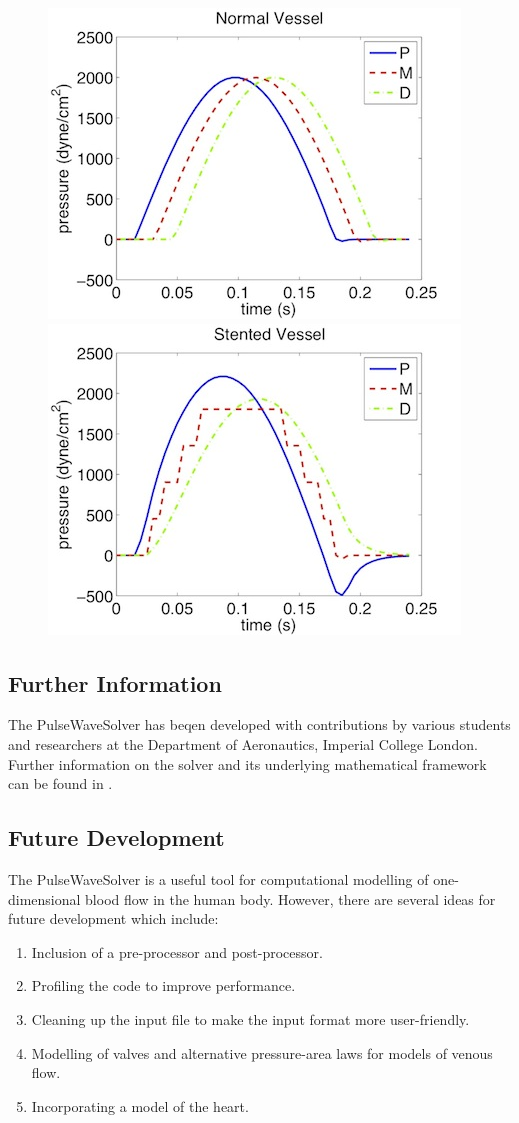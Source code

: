 \begin{figure}
	\includegraphics[width=0.49\linewidth]{img/pressure_normal_vessel.jpg}
	\includegraphics[width=0.49\linewidth]{img/pressure_stented_vessel.jpg}
\end{figure}

\subsection{Further Information}
The PulseWaveSolver has beqen developed with contributions by various students
and researchers at the Department of Aeronautics, Imperial College London. 
Further information on the solver and its underlying mathematical framework 
can be found in \cite{Ro12,Pi12}.

\subsection{Future Development}
The PulseWaveSolver is a useful tool for computational modelling of
one-dimensional blood flow in the human body. However, there are several ideas
for future development which include:
\begin{enumerate}
\item Inclusion of a pre-processor and post-processor.
\item Profiling the code to improve performance.
\item Cleaning up the input file to make the input format more user-friendly.
\item Modelling of valves and alternative pressure-area laws for models of
venous flow.
\item Incorporating a model of the heart.
\end{enumerate}

